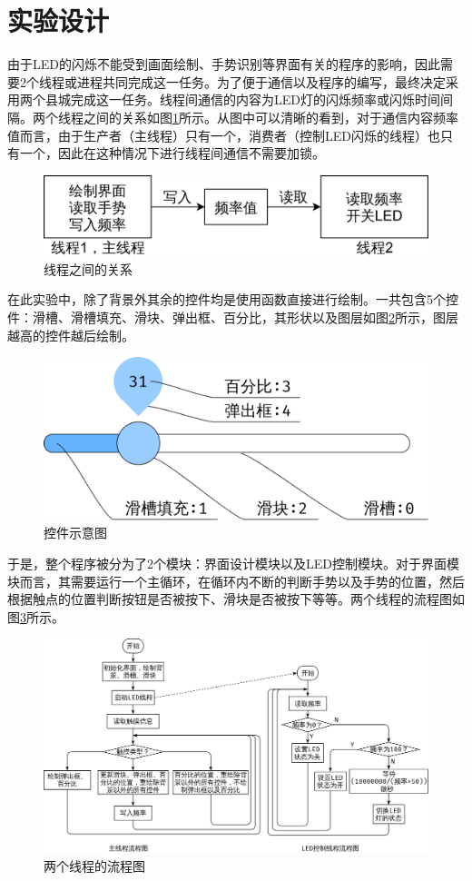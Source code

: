 \documentclass{report}
\begin{document}
\section{实验设计}
\par 由于LED的闪烁不能受到画面绘制、手势识别等界面有关的程序的影响，因此需要2个线程或进程共同完成这一任务。为了便于通信以及程序的编写，最终决定采用两个县城完成这一任务。线程间通信的内容为LED灯的闪烁频率或闪烁时间间隔。两个线程之间的关系如图\ref{fig:threadRelation}所示。从图中可以清晰的看到，对于通信内容频率值而言，由于生产者（主线程）只有一个，消费者（控制LED闪烁的线程）也只有一个，因此在这种情况下进行线程间通信不需要加锁。
\begin{figure}[htpb]
    \centering
    \includegraphics[width=0.6\linewidth]{threadRelation.png}
    \caption{线程之间的关系}
    \label{fig:threadRelation}
\end{figure}

\par 在此实验中，除了背景外其余的控件均是使用函数直接进行绘制。一共包含5个控件：滑槽、滑槽填充、滑块、弹出框、百分比，其形状以及图层如图\ref{fig:stack}所示，图层越高的控件越后绘制。
\begin{figure}[htpb]
    \centering
    \includegraphics[width=0.4\linewidth]{stack.png}
    \caption{控件示意图}
    \label{fig:stack}
\end{figure}

\par 于是，整个程序被分为了2个模块：界面设计模块以及LED控制模块。对于界面模块而言，其需要运行一个主循环，在循环内不断的判断手势以及手势的位置，然后根据触点的位置判断按钮是否被按下、滑块是否被按下等等。两个线程的流程图如图\ref{fig:flow1}所示。
\begin{figure}[htpb]
    \centering
    \includegraphics[width=0.9\linewidth]{flow1.png}
    \caption{两个线程的流程图}
    \label{fig:flow1}
\end{figure}
\end{document}
